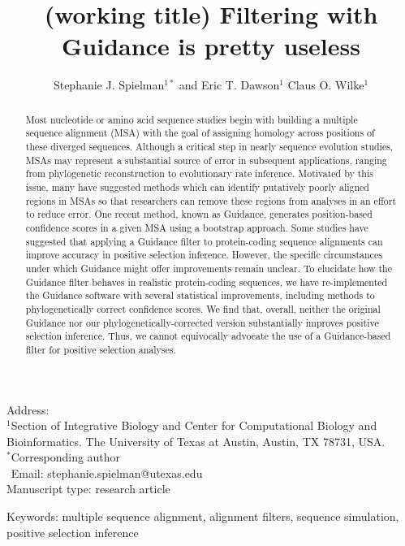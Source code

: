 \documentclass[10pt]{article}
\begin{document}
\title{\textbf{(working title) Filtering with Guidance is pretty useless}}
\author{Stephanie J. Spielman$^{1*}$ and Eric T. Dawson$^{1}$ Claus O. Wilke$^{1}$}
\date{}

\maketitle
\noindent
Address:\\
$^1$Section of Integrative Biology and Center for Computational Biology and Bioinformatics. The University
of Texas at Austin, Austin, TX 78731, USA.\\

\bigskip
\noindent
$^*$Corresponding author\\
$\phantom{^*}$Email: stephanie.spielman@utexas.edu\\

\bigskip
\noindent
Manuscript type: research article

\bigskip
\noindent Keywords: multiple sequence alignment, alignment filters, sequence simulation, positive selection inference

\newpage
\begin{abstract}
	Most nucleotide or amino acid sequence studies begin with building a multiple sequence alignment (MSA) with the goal of assigning homology across positions of these diverged sequences. Although a critical step in nearly sequence evolution studies, MSAs may represent a substantial source of error in subsequent applications, ranging from phylogenetic reconstruction to evolutionary rate inference. Motivated by this issue, many have suggested methods which can identify putatively poorly aligned regions in MSAs so that researchers can remove these regions from analyses in an effort to reduce error. One recent method, known as Guidance, generates position-based confidence scores in a given MSA using a bootstrap approach. Some studies have suggested that applying a Guidance filter to protein-coding sequence alignments can improve accuracy in positive selection inference. However, the specific circumstances under which Guidance might offer improvements remain unclear. To elucidate how the Guidance filter behaves in realistic protein-coding sequences, we have re-implemented the Guidance software with several statistical improvements, including methods to phylogenetically correct confidence scores. We find that, overall, neither the original Guidance nor our phylogenetically-corrected version substantially improves positive selection inference. Thus, we cannot equivocally advocate the use of a Guidance-based filter for positive selection analyses.
\end{abstract}
\end{document}
